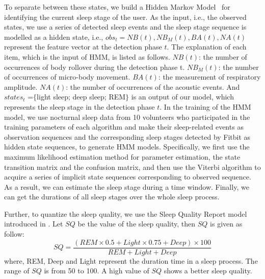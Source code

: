 To separate between these states, we build a Hidden Markov Model~\cite{johnson2010hidden} for identifying the current sleep stage of the
user. As the input, i.e., the observed states, we use a series of detected sleep events and the sleep stage sequence is modelled as a
hidden state, i.e., $obs_t={NB(t),NB_M(t),BA(t),NA(t)}$ represent the feature vector at the detection phase $t$. The explanation of each
item, which is the input of HMM, is listed as follows. $NB(t)$: the number of occurrences of body rollover during the detection phase t.
$NB_M(t)$: the number of occurrences of micro-body movement. $BA(t)$: the measurement of respiratory amplitude.  $NA(t)$: the number of
occurrences of the acoustic events. And $states_t$ =$\{$light sleep; deep sleep; REM$\}$ is an output of our model, which represents the
sleep stage in the detection phase $t$. In the training of the HMM model, we use nocturnal sleep data from 10 volunteers who participated
in the training parameters of each algorithm and make their sleep-related events as observation sequences and the corresponding sleep
stages detected by Fitbit as hidden state sequences, to generate HMM models. Specifically, we first use the maximum likelihood estimation
method for parameter estimation, the state transition matrix and the confusion matrix, and then use the Viterbi algorithm to acquire a
series of implicit state sequences corresponding to observed sequence.  As a result, we can estimate the sleep stage during a time window.
Finally, we can get the durations of all sleep stages over the whole sleep process.

Further, to quantize the sleep quality, we use the Sleep Quality Report model introduced in \cite{gu2016sleep}. Let $SQ$ be the value of the sleep quality, then $SQ$ is given as follow:
 \begin{equation}
SQ=\frac{(REM \times 0.5+Light \times 0.75+Deep) \times 100}{REM+Light+Deep}
 \end{equation}
where, REM, Deep and Light represent the duration time in a sleep process. The range of $SQ$ is from 50 to 100. A high value of $SQ$ shows a better  sleep quality.
